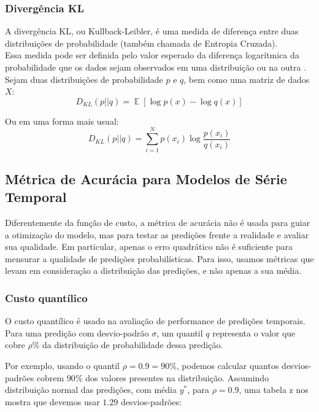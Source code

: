 \subsubsection{Divergência KL}

A divergência KL, ou Kullback-Leibler, é uma medida de diferença entre duas distribuições de probabilidade (também chamada de Entropia Cruzada). \\
Essa medida pode ser definida pelo valor esperado da diferença logarítmica da
probabilidade que os dados sejam observados em uma distribuição ou na outra \citep{dlbook}. \\
Sejam duas distribuições de probabilidade $p$ e $q$, bem como uma matriz de dados $X$: \\

\[D_{KL}(p || q) = \mathop{\mathbb{E}}[\log p(x) - \log q(x)]​\]

Ou em uma forma mais usual: \\

\[D_{KL}(p||q) = \sum_{i=1}^{N}p(x_{i}) \log \frac{p(x_{i})}{q(x_{i})}​\]



\subsection{Métrica de Acurácia para Modelos de Série Temporal}

Diferentemente da função de custo, a métrica de acurácia não é usada para guiar a otimização do modelo,
mas para testar as predições frente a realidade e avaliar sua qualidade. Em
particular, apenas o erro quadrático não é suficiente para mensurar a qualidade
de predições probabilísticas. Para isso, usamos métricas que levam em
consideração a distribuição das predições, e não apenas a sua média.\\

\subsubsection{Custo quantílico}
\label{sec:quant}
O custo quantílico \citep{deepar} é usado na avaliação de performance de
predições temporais. \\

Para uma predição com desvio-padrão $\sigma$, um quantil $q$ representa o
valor que cobre $\rho\%$ da distribuição de probabilidade dessa predição.

Por exemplo, usando o quantil $\rho=0.9=90\%$, podemos calcular quantos
desvios-padrões cobrem $90\%$ dos valores presentes na distribuição.
Assumindo distribuição normal das predições, com média $y^*$, para $\rho=0.9$, uma tabela z nos mostra que devemos usar $1.29$ desvios-padrões:

